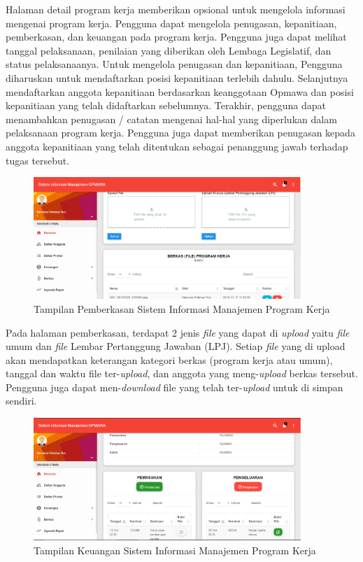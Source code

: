 Halaman detail program kerja memberikan opsional untuk mengelola informasi mengenai program kerja. Pengguna dapat mengelola penugasan, kepanitiaan, pemberkasan, dan keuangan pada program kerja. Pengguna juga dapat melihat tanggal pelaksanaan, penilaian yang diberikan oleh Lembaga Legislatif, dan status pelaksanaanya. Untuk mengelola penugasan dan kepanitiaan, Pengguna diharuskan untuk mendaftarkan posisi kepanitiaan terlebih dahulu. Selanjutnya mendaftarkan anggota kepanitiaan berdasarkan keanggotaan Opmawa dan posisi kepanitiaan yang telah didaftarkan sebelumnya. Terakhir, pengguna dapat menambahkan penugasan / catatan mengenai hal-hal yang diperlukan dalam pelaksanaan program kerja. Pengguna juga dapat memberikan penugasan kepada anggota kepanitiaan yang telah ditentukan sebagai penanggung jawab terhadap tugas tersebut.

\begin{figure}[H]
	\centering
	\includegraphics[width=0.9\textwidth]{gambar/interface_berkas}
	\caption{ Tampilan Pemberkasan Sistem Informasi Manajemen Program Kerja}
	\label{Tampilan_Berkas}
\end{figure}

Pada halaman pemberkasan, terdapat 2 jenis \textit{file} yang dapat di \textit{upload} yaitu \textit{file} umum dan \textit{file} Lembar Pertanggung Jawaban (LPJ). Setiap \textit{file} yang di upload akan mendapatkan keterangan kategori berkas (program kerja atau umum), tanggal dan waktu file ter-\textit{upload}, dan anggota yang meng-\textit{upload} berkas tersebut. Pengguna juga dapat men-\textit{download} file yang telah ter-\textit{upload} untuk di simpan sendiri. 

\begin{figure}[H]
	\centering
	\includegraphics[width=0.9\textwidth]{gambar/interface_keuangan}
	\caption{ Tampilan Keuangan Sistem Informasi Manajemen Program Kerja}
	\label{Tampilan_Keuangan}
\end{figure}

